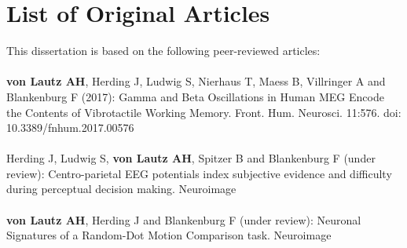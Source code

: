 
\chapter*{List of Original Articles}

This dissertation is based on the following peer-reviewed articles: \\ \\

\textbf{von Lautz AH}, Herding J, Ludwig S, Nierhaus T, Maess B, Villringer A and Blankenburg F (2017): Gamma and Beta Oscillations in Human MEG Encode the Contents of Vibrotactile Working Memory. Front. Hum. Neurosci. 11:576. doi: 10.3389/fnhum.2017.00576 \\ \\

Herding J, Ludwig S, \textbf{von Lautz AH}, Spitzer B and Blankenburg F (under review): Centro-parietal EEG potentials index subjective evidence and difficulty during perceptual decision making. Neuroimage \\ \\

\textbf{von Lautz AH}, Herding J and Blankenburg F (under review): Neuronal Signatures of a Random-Dot Motion Comparison task. Neuroimage


